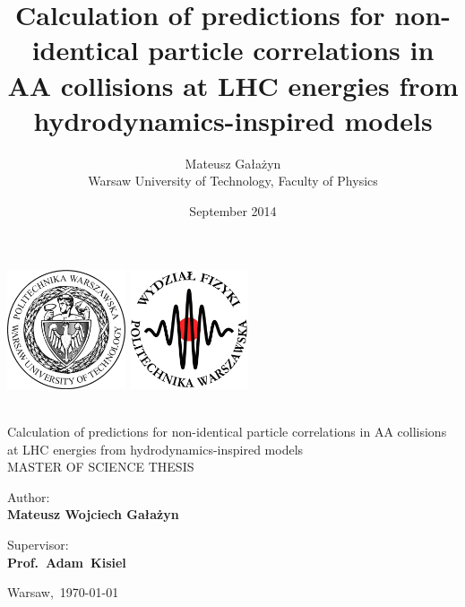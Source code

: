 \documentclass[11pt,a4paper,openright]{report}
\title{Calculation of predictions for non-identical particle correlations in AA collisions at LHC energies from hydrodynamics-inspired models}
\author{Mateusz Gałażyn \\  \centering Warsaw University of Technology, Faculty of Physics}
\date{September 2014}
\begin{document}


\newcommand{\HRule}{\rule{\linewidth}{0.1mm}} %

\begin{titlepage}
	\includegraphics[height=3.5cm]{wut}
	    \hfill
	\includegraphics[height=3.5cm]{wut_physics}

	\center
	{\textbf{}}\\[3.3cm]
	{ \Huge Calculation of predictions for non-identical particle correlations in AA collisions at LHC energies from hydrodynamics-inspired models}
	\\[3cm]

	\LARGE\uppercase{Master of Science Thesis}\\[1.3cm]
		\begin{flushright} \Large
		Author:\hspace{2.cm}~\\
		\textbf{Mateusz Wojciech Gałażyn}\\[-0.5cm]
		\end{flushright}

		\begin{flushright} \Large
		Supervisor:\hspace{1.6cm}~\\
		\textbf{Prof.~Adam~{Kisiel}}\hspace{1.1cm}~\\[0.0cm]
		\end{flushright}

	{\large Warsaw,~\mydateEN\today}
	\vfill
\end{titlepage}	
\cleardoublepage
\end{document}
